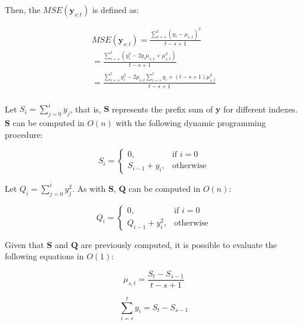 Then, the $MSE(\mathbf{y}_{s : t})$ is defined as:

\begin{equation}
    \label{mse}
    \begin{aligned}
        MSE(\mathbf{y}_{s : t}) = \frac{\sum \limits_{i = s}^{t} (y_{i} - \mu_{s, t})^{2}}{t - s + 1} \\
        = \frac{\sum \limits_{i = s}^{t} (y_{i}^{2} - 2 y_{i} \mu_{s, t} + \mu_{s, t}^{2})}{t - s + 1} \\
        = \frac{\sum \limits_{i = s}^{t} y_{i}^{2} - 2 \mu_{s, t} \sum \limits_{i = s}^{t} y_{i} + (t - s + 1) \mu_{s, t}^{2}}{t - s + 1} \\
    \end{aligned}
\end{equation}

Let $S_{i} = \sum \limits_{j = 0}^{i} y_{j}$, that is, $\mathbf{S}$ represents the prefix sum of $\mathbf{y}$ for different indexes. $\mathbf{S}$ can be computed in $O(n)$ with the following dynamic programming procedure: 

\begin{equation}
    S_{i} = 
    \begin{cases}
        0, & \text{if } i = 0 \\
        S_{i - 1} + y_{i}, & \text{otherwise}
    \end{cases}
\end{equation}

Let $Q_{i} = \sum \limits_{j = 0}^{i} y_{j}^{2}$. As with $\mathbf{S}$, $\mathbf{Q}$ can be computed in $O(n)$: 

\begin{equation}
    Q_{i} = 
    \begin{cases}
        0, & \text{if } i = 0 \\
        Q_{i - 1} + y_{i}^{2}, & \text{otherwise}
    \end{cases}
\end{equation}

Given that $\mathbf{S}$ and $\mathbf{Q}$ are previously computed, it is possible to evaluate the following equations in $O(1)$: 

\begin{equation}
    \label{mean_o1}
    \mu_{s, t} = \frac{S_{t} - S_{s - 1}}{t - s + 1}
\end{equation}

\begin{equation}
    \label{prefixsum1_o1}
    \sum \limits_{i = s}^{t} y_{i} = S_{t} - S_{s - 1}
\end{equation}

